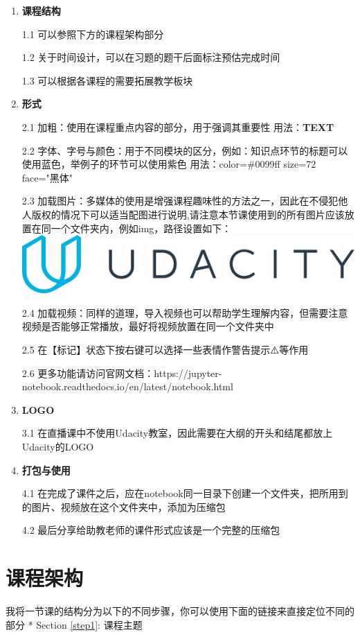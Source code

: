 \documentclass[11pt]{article}
\makeatletter
\def\maxwidth{\ifdim\Gin@nat@width>\linewidth\linewidth
    \else\Gin@nat@width\fi}
\let\Oldincludegraphics\includegraphics
\renewcommand{\includegraphics}[1]{\Oldincludegraphics[width=.8\maxwidth]{#1}}
\makeatother
\begin{document}
\begin{enumerate}
\def\labelenumi{\arabic{enumi}.}
\item
  \textbf{课程结构}

  1.1 可以参照下方的课程架构部分

  1.2 关于时间设计，可以在习题的题干后面标注预估完成时间

  1.3 可以根据各课程的需要拓展教学板块
\item
  \textbf{形式}

  2.1 加粗：使用在课程重点内容的部分，用于强调其重要性
  用法：\textbf{TEXT}

  2.2
  字体、字号与颜色：用于不同模块的区分，例如：知识点环节的标题可以使用蓝色，举例子的环节可以使用紫色
  用法：color=\#0099ff size=72 face="黑体"

  2.3
  加载图片：多媒体的使用是增强课程趣味性的方法之一，因此在不侵犯他人版权的情况下可以适当配图进行说明,请注意本节课使用到的所有图片应该放置在同一个文件夹内，例如img，路径设置如下：
  \includegraphics{img/logo1.png}

  2.4
  加载视频：同样的道理，导入视频也可以帮助学生理解内容，但需要注意视频是否能够正常播放，最好将视频放置在同一个文件夹中

  2.5 在【标记】状态下按右键可以选择一些表情作警告提示⚠️等作用

  2.6
  更多功能请访问官网文档：https://jupyter-notebook.readthedocs.io/en/latest/notebook.html
\item
  \textbf{LOGO}

  3.1
  在直播课中不使用Udacity教室，因此需要在大纲的开头和结尾都放上Udacity的LOGO
\item
  \textbf{打包与使用}

  4.1
  在完成了课件之后，应在notebook同一目录下创建一个文件夹，把所用到的图片、视频放在这个文件夹中，添加为压缩包

  4.2 最后分享给助教老师的课件形式应该是一个完整的压缩包
\end{enumerate}

    \section{课程架构}\label{ux8bfeux7a0bux67b6ux6784}

我将一节课的结构分为以下的不同步骤，你可以使用下面的链接来直接定位不同的部分
* Section \ref{step1}: 课程主题
\end{document}
